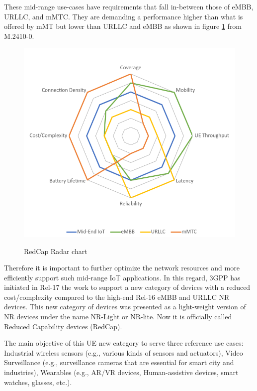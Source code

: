 \documentclass[conference]{IEEEtran}
\begin{document}
These mid-range use-cases have requirements that fall in-between those of eMBB, URLLC, and mMTC. They are demanding a performance higher than what is offered by mMT but lower than URLLC and eMBB as shown in figure \ref{fig:redcap-spider} from M.2410-0. 
\begin{figure}
    \centering
    \includegraphics[width=\linewidth]{Pictures/Radar Chart RedCap.png}
    \label{fig:redcap-spider}
    \caption{RedCap Radar chart}
\end{figure}

Therefore it is important to further optimize the network resources and more efficiently support such mid-range IoT applications. In this regard, 3GPP has initiated in Rel-17 the work to support a new category of devices with a reduced cost/complexity compared to the high-end Rel-16 eMBB and URLLC NR devices. This new category of devices was presented as a light-weight version of NR devices under the name NR-Light or NR-lite. Now it is officially called Reduced Capability devices (RedCap).

The main objective of this UE new category to serve three reference use cases: Industrial wireless sensors (e.g., various kinds of sensors and actuators), Video Surveillance (e.g., surveillance cameras that are essential for smart city and industries), Wearables (e.g., AR/VR devices, Human-assistive devices, smart watches, glasses,  etc.).
\end{document}
